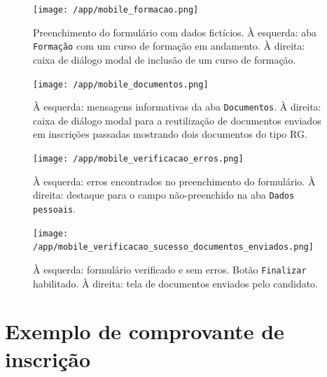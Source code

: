 \documentclass[
  10.5pt,				  %
	openright,			%
	twoside,			  %
  a5paper,
  chapter=TITLE,	%
	section=TITLE,	%
  hyphens,        %
	english,        %
	brazil          %
]{abntex2}
\begin{document}
\begin{figure}[!ht]
  \caption{\label{fig:mobile_formacao} Preenchimento do formulário com dados fictícios. À esquerda: aba \texttt{Formação} com um curso de formação em andamento. À direita: caixa de diálogo modal de inclusão de um curso de formação.}
  \begin{center}
    \texttt{[image: /app/mobile\_formacao.png]}
  \end{center}
\end{figure}

\begin{figure}[!ht]
  \caption{\label{fig:mobile_documentos} À esquerda: mensagens informativas da aba \texttt{Documentos}. À direita: caixa de diálogo modal para a reutilização de documentos enviados em inscrições passadas mostrando dois documentos do tipo RG.}
  \begin{center}
    \texttt{[image: /app/mobile\_documentos.png]}
  \end{center}
\end{figure}


\begin{figure}[!ht]
  \caption{\label{fig:mobile_verificacao_erros} À esquerda: erros encontrados no preenchimento do formulário. À direita: destaque para o campo não-preenchido na aba \texttt{Dados pessoais}.}
  \begin{center}
    \texttt{[image: /app/mobile\_verificacao\_erros.png]}
  \end{center}
\end{figure}

\begin{figure}[!ht]
  \caption{\label{fig:mobile_verificacao_sucesso_documentos_enviados} À esquerda: formulário verificado e sem erros. Botão \texttt{Finalizar} habilitado. À direita: tela de documentos enviados pelo candidato.}
  \begin{center}
    \texttt{[image: /app/mobile\_verificacao\_sucesso\_documentos\_enviados.png]}
  \end{center}
\end{figure}



\chapter{Exemplo de comprovante de inscrição}\label{anexo:comprovante}
\end{document}
